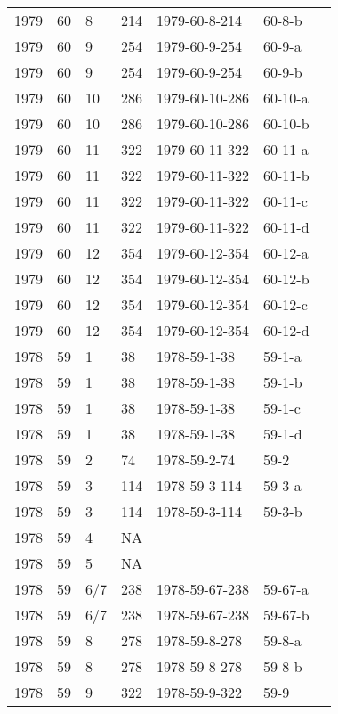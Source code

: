 \begin{longtable}{ |l|l|l|l|p{2.7cm}|l|p{2cm}| }
 1979 & 60 &     8 &     214 & 1979-60-8-214  & 60-8-b & \\
 1979 & 60 &     9 &     254 & 1979-60-9-254  & 60-9-a & \\
 1979 & 60 &     9 &     254 & 1979-60-9-254  & 60-9-b & \\
 1979 & 60 &    10 &     286 & 1979-60-10-286 & 60-10-a & \\
 1979 & 60 &    10 &     286 & 1979-60-10-286 & 60-10-b & \\
 1979 & 60 &    11 &     322 & 1979-60-11-322 & 60-11-a & \\
 1979 & 60 &    11 &     322 & 1979-60-11-322 & 60-11-b & \\
 1979 & 60 &    11 &     322 & 1979-60-11-322 & 60-11-c & \\
 1979 & 60 &    11 &     322 & 1979-60-11-322 & 60-11-d & \\
 1979 & 60 &    12 &     354 & 1979-60-12-354 & 60-12-a & \\
 1979 & 60 &    12 &     354 & 1979-60-12-354 & 60-12-b & \\
 1979 & 60 &    12 &     354 & 1979-60-12-354 & 60-12-c & \\
 1979 & 60 &    12 &     354 & 1979-60-12-354 & 60-12-d & \\
 1978 & 59 &     1 &      38 & 1978-59-1-38   & 59-1-a & \\
 1978 & 59 &     1 &      38 & 1978-59-1-38   & 59-1-b & \\
 1978 & 59 &     1 &      38 & 1978-59-1-38   & 59-1-c & \\
 1978 & 59 &     1 &      38 & 1978-59-1-38   & 59-1-d & \\
 1978 & 59 &     2 &      74 & 1978-59-2-74   & 59-2 & \\
 1978 & 59 &     3 &     114 & 1978-59-3-114  & 59-3-a & \\
 1978 & 59 &     3 &     114 & 1978-59-3-114  & 59-3-b & \\
 1978 & 59 &     4 &      NA &                &  & \\
 1978 & 59 &     5 &      NA &                &  & \\
 1978 & 59 &   6/7 &     238 & 1978-59-67-238 & 59-67-a & \\
 1978 & 59 &   6/7 &     238 & 1978-59-67-238 & 59-67-b & \\
 1978 & 59 &     8 &     278 & 1978-59-8-278  & 59-8-a & \\
 1978 & 59 &     8 &     278 & 1978-59-8-278  & 59-8-b & \\
 1978 & 59 &     9 &     322 & 1978-59-9-322  & 59-9  & \\

\end{longtable}
